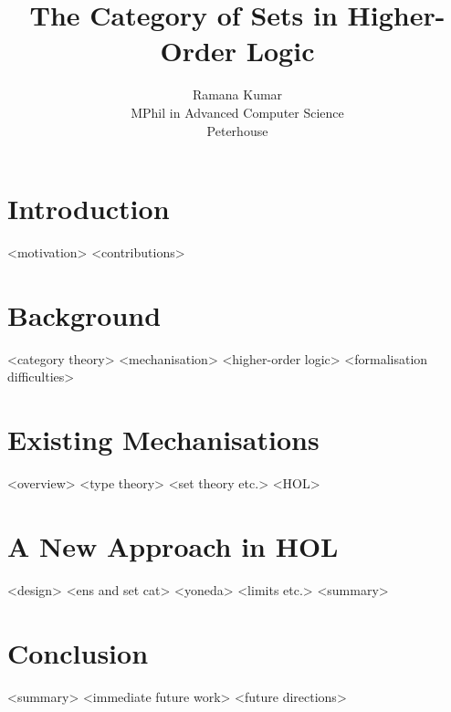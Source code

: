 \documentclass[twoside,titlepage,11pt]{article}
\title{The Category of Sets in Higher-Order Logic}
\author{Ramana Kumar\\MPhil in Advanced Computer Science\\Peterhouse}
\begin{document}
\maketitle
\section{Introduction}%
<motivation>%
<contributions>%
\section{Background}%
<category theory>%
<mechanisation>%
<higher-order logic>%
<formalisation difficulties>%
\section{Existing Mechanisations}%
<overview>%
<type theory>%
<set theory etc.>%
<HOL>%
\section{A New Approach in HOL}%
<design>%
<ens and set cat>%
<yoneda>%
<limits etc.>%
<summary>%
\section{Conclusion}%
<summary>%
<immediate future work>%
<future directions>%


\end{document}
